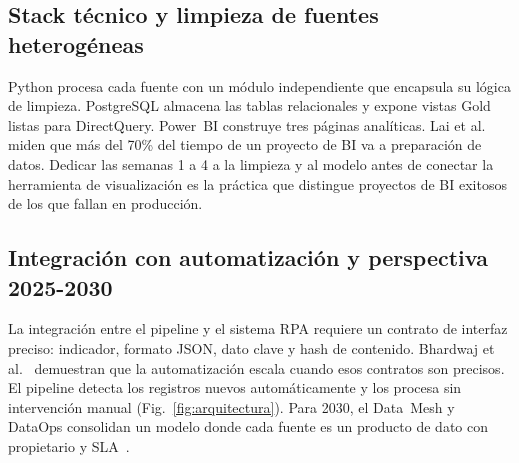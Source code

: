 \documentclass[10pt,twocolumn,spanish]{IEEEtran}
\begin{document}
\subsection{Stack técnico y limpieza de fuentes heterogéneas}

Python procesa cada fuente con un módulo independiente que encapsula
su lógica de limpieza. PostgreSQL almacena las tablas relacionales y
expone vistas Gold listas para DirectQuery. Power~BI construye tres
páginas analíticas. Lai et al.~\cite{lai2025} miden que más del
70\% del tiempo de un proyecto de BI va a preparación de datos.
Dedicar las semanas 1 a 4 a la limpieza y al modelo antes de
conectar la herramienta de visualización es la práctica que
distingue proyectos de BI exitosos de los que fallan en producción.

\subsection{Integración con automatización y perspectiva 2025-2030}

La integración entre el pipeline y el sistema RPA requiere un
contrato de interfaz preciso: indicador, formato JSON, dato clave y
hash de contenido. Bhardwaj et al.~\cite{bhardwaj2024} demuestran
que la automatización escala cuando esos contratos son precisos.
El pipeline detecta los registros nuevos automáticamente y los
procesa sin intervención manual
(Fig.~\ref{fig:arquitectura}). Para 2030, el Data~Mesh y DataOps
consolidan un modelo donde cada fuente es un producto de dato con
propietario y SLA~\cite{machado2022}.
\end{document}
